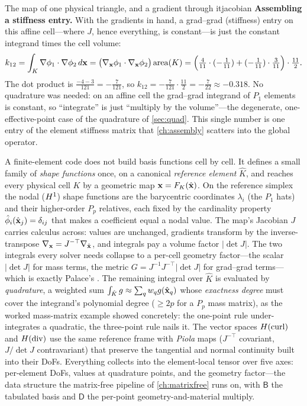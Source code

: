 \begin{workedexample}{The map of one physical triangle, and a gradient through it}{jacobian}
\smallskip\noindent\textbf{Assembling a stiffness entry.} With the gradients in hand,
a grad--grad (stiffness) entry on this affine cell---where $J$, hence everything, is
constant---is just the constant integrand times the cell volume:
\[
  k_{12} = \int_K \nabla\phi_1\cdot\nabla\phi_2\,d\mathbf{x}
  = \bigl(\nabla_{\mathbf{x}}\phi_1\cdot\nabla_{\mathbf{x}}\phi_2\bigr)\,\mathrm{area}(K)
  = \Bigl(\tfrac{4}{11}\cdot(-\tfrac{1}{11}) + (-\tfrac{1}{11})\cdot\tfrac{3}{11}\Bigr)\cdot\tfrac{11}{2}.
\]
The dot product is $\tfrac{-4-3}{121}=-\tfrac{7}{121}$, so
$k_{12} = -\tfrac{7}{121}\cdot\tfrac{11}{2} = -\tfrac{7}{22}\approx -0.318$. No
quadrature was needed: on an affine cell the grad--grad integrand of $P_1$ elements
is constant, so ``integrate'' is just ``multiply by the volume''---the degenerate,
one-effective-point case of the quadrature of \cref{sec:quad}. This single number is
one entry of the element stiffness matrix that \cref{ch:assembly} scatters into the
global operator.
\end{workedexample}

\summarysection
A finite-element code does not build basis functions cell by cell. It defines a small
family of \emph{shape functions} once, on a canonical \emph{reference element}
$\hat K$, and reaches every physical cell $K$ by a geometric map $\mathbf{x}=F_K(\hat{\mathbf{x}})$.
On the reference simplex the nodal ($H^1$) shape functions are the barycentric
coordinates $\lambda_i$ (the $P_1$ hats) and their higher-order $P_p$ relatives, each
fixed by the cardinality property $\hat\phi_i(\hat{\mathbf{x}}_j)=\delta_{ij}$ that makes a
coefficient equal a nodal value. The map's Jacobian $J$ carries calculus across:
values are unchanged, gradients transform by the inverse-transpose
$\nabla_{\mathbf{x}}=J^{-\top}\nabla_{\hat{\mathbf{x}}}$, and integrals pay a volume factor $|\det J|$.
The two integrals every solver needs collapse to a per-cell geometry factor---the
scalar $|\det J|$ for mass terms, the metric $G=J^{-1}J^{-\top}|\det J|$ for
grad--grad terms---which is exactly Palace's . The remaining
integral over $\hat K$ is evaluated by \emph{quadrature}, a weighted sum
$\int_{\hat K}g\approx\sum_q w_q g(\hat{\mathbf{x}}_q)$ whose \emph{exactness degree} must
cover the integrand's polynomial degree ($\ge 2p$ for a $P_p$ mass matrix), as the
worked mass-matrix example showed concretely: the one-point rule under-integrates a
quadratic, the three-point rule nails it. The vector spaces $H(\mathrm{curl})$ and $H(\mathrm{div})$ use
the same reference frame with \emph{Piola} maps ($J^{-\top}$ covariant,
$J/\det J$ contravariant) that preserve the tangential and normal continuity built
into their DoFs. Everything collects into the element-local tensor over five axes:
\code{[(E,L)]} per-element DoFs, \code{[(E,P,C)]} values at quadrature points, and
\code{[(E,P,G)]} the geometry factor---the data structure the matrix-free pipeline of
\cref{ch:matrixfree} runs on, with $\mathsf{B}$ the tabulated basis and $\mathsf{D}$
the per-point geometry-and-material multiply.

